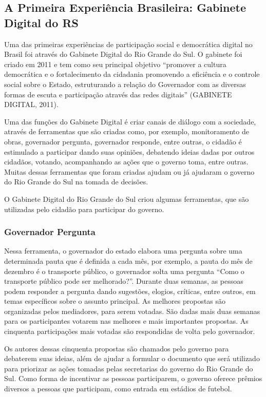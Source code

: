 \subsection{A Primeira Experiência Brasileira: Gabinete Digital do RS}

Uma das primeiras experiências de participação social e democrática digital no Brasil foi através do Gabinete Digital do Rio Grande do Sul. O gabinete foi criado em 2011 e tem como seu principal objetivo “promover a cultura democrática e o fortalecimento da cidadania promovendo a eficiência e o controle social sobre o Estado, estruturando a relação do Governador com as diversas formas de escuta e participação através das redes digitais” (GABINETE DIGITAL, 2011).

Uma das funções do Gabinete Digital é criar canais de diálogo com a sociedade, através de ferramentas que são criadas como, por exemplo, monitoramento de obras, governador pergunta, governador responde, entre outras, o cidadão é estimulado a participar dando suas opiniões, debatendo ideias dadas por outros cidadãos, votando, acompanhando as ações que o governo toma, entre outras. Muitas dessas ferramentas que foram criadas ajudam ou já ajudaram o governo do Rio Grande do Sul na tomada de decisões.

O Gabinete Digital do Rio Grande do Sul criou algumas ferramentas, que são utilizadas pelo cidadão para participar do governo.

\subsubsection{Governador Pergunta}

Nessa ferramenta, o governador do estado elabora uma pergunta sobre uma determinada pauta que é definida a cada mês, por exemplo, a pauta do mês de dezembro é o transporte público, o governador solta uma pergunta “Como o transporte público pode ser melhorado?”. Durante duas semanas, as pessoas podem responder a pergunta dando sugestões, elogios, críticas, entre outros, em temas específicos sobre o assunto principal. As melhores propostas são organizadas pelos mediadores, para serem votadas. São dadas mais duas semanas para os participantes votarem nas melhores e mais importantes propostas. As cinquenta participações mais votadas são respondidas de volta pelo governador.

Os autores dessas cinquenta propostas são chamados pelo governo para debaterem suas ideias, além de ajudar a formular o documento que será utilizado para priorizar as ações tomadas pelas secretarias do governo do Rio Grande do Sul.
	Como forma de incentivar as pessoas participarem, o governo oferece prêmios diversos a pessoas que participam, como entrada em estádios de futebol. 

